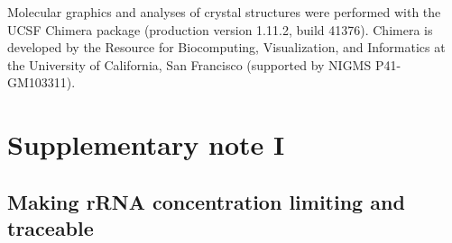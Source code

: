 Molecular graphics and analyses 
of crystal structures
%
were performed with the UCSF Chimera package (production version 1.11.2, build 41376). Chimera is developed by the Resource for Biocomputing, Visualization, and Informatics at the University of California, San Francisco (supported by NIGMS P41-GM103311). 





\FloatBarrier
\clearpage

\section{Supplementary note I}
\label{supp:ribo:1}

\subsection{Making rRNA concentration limiting and traceable}




